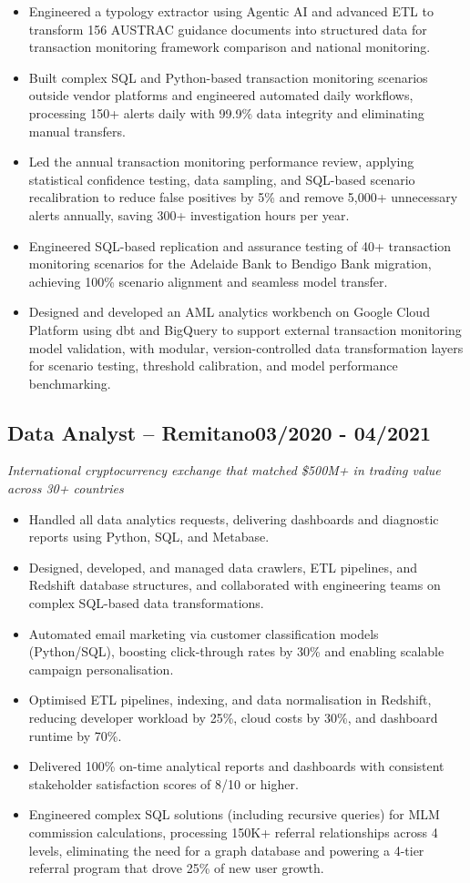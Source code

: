 \documentclass[11pt,a4paper]{article}
\newcommand{\role}[3]{%
  \subsection*{#1 \textnormal{--} \textbf{#2}\hfill #3}}
\begin{document}
\begin{itemize}
  \item Engineered a typology extractor using Agentic AI and advanced ETL to transform 156 AUSTRAC guidance documents into structured data for transaction monitoring framework comparison and national monitoring.
  \item Built complex SQL and Python-based transaction monitoring scenarios outside vendor platforms and engineered automated daily workflows, processing 150+ alerts daily with 99.9\% data integrity and eliminating manual transfers.
  \item Led the annual transaction monitoring performance review, applying statistical confidence testing, data sampling, and SQL-based scenario recalibration to reduce false positives by 5\% and remove 5,000+ unnecessary alerts annually, saving 300+ investigation hours per year.
  \item Engineered SQL-based replication and assurance testing of 40+ transaction monitoring scenarios for the Adelaide Bank to Bendigo Bank migration, achieving 100\% scenario alignment and seamless model transfer.
  \item Designed and developed an AML analytics workbench on Google Cloud Platform using dbt and BigQuery to support external transaction monitoring model validation, with modular, version-controlled data transformation layers for scenario testing, threshold calibration, and model performance benchmarking.
\end{itemize}

\role{Data Analyst}{Remitano}{03/2020 - 04/2021}
\textit{International cryptocurrency exchange that matched \$500M+ in trading value across 30+ countries}
\begin{itemize}
  \item Handled all data analytics requests, delivering dashboards and diagnostic reports using Python, SQL, and Metabase.
  \item Designed, developed, and managed data crawlers, ETL pipelines, and Redshift database structures, and collaborated with engineering teams on complex SQL-based data transformations.
  \item Automated email marketing via customer classification models (Python/SQL), boosting click-through rates by 30\% and enabling scalable campaign personalisation.
  \item Optimised ETL pipelines, indexing, and data normalisation in Redshift, reducing developer workload by 25\%, cloud costs by 30\%, and dashboard runtime by 70\%.
  \item Delivered 100\% on-time analytical reports and dashboards with consistent stakeholder satisfaction scores of 8/10 or higher.
  \item Engineered complex SQL solutions (including recursive queries) for MLM commission calculations, processing 150K+ referral relationships across 4 levels, eliminating the need for a graph database and powering a 4-tier referral program that drove 25\% of new user growth.
\end{itemize}
\end{document}
